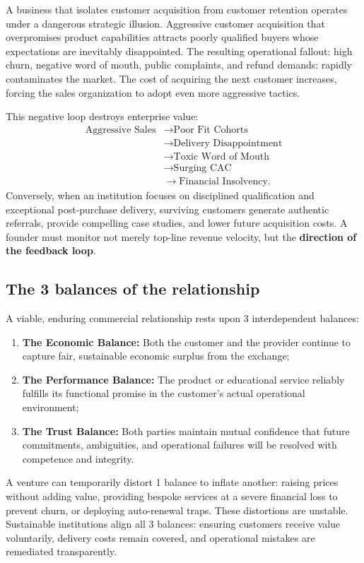 A business that isolates customer acquisition from customer retention operates under a dangerous strategic illusion. Aggressive customer acquisition that overpromises product capabilities attracts poorly qualified buyers whose expectations are inevitably disappointed. The resulting operational fallout: high churn, negative word of mouth, public complaints, and refund demands: rapidly contaminates the market. The cost of acquiring the next customer increases, forcing the sales organization to adopt even more aggressive tactics.

This negative loop destroys enterprise value:
\begin{equation}
\begin{aligned}
\text{Aggressive Sales} &\longrightarrow \text{Poor Fit Cohorts} \\
&\longrightarrow \text{Delivery Disappointment} \\
&\longrightarrow \text{Toxic Word of Mouth} \\
&\longrightarrow \text{Surging CAC} \\
&\longrightarrow \text{Financial Insolvency}.
\end{aligned}
\end{equation}
Conversely, when an institution focuses on disciplined qualification and exceptional post-purchase delivery, surviving customers generate authentic referrals, provide compelling case studies, and lower future acquisition costs. A founder must monitor not merely top-line revenue velocity, but the \textbf{direction of the feedback loop}.

\subsection{The 3 balances of the relationship}

A viable, enduring commercial relationship rests upon 3 interdependent balances:
\begin{enumerate}
\item \textbf{The Economic Balance:} Both the customer and the provider continue to capture fair, sustainable economic surplus from the exchange;
\item \textbf{The Performance Balance:} The product or educational service reliably fulfills its functional promise in the customer's actual operational environment;
\item \textbf{The Trust Balance:} Both parties maintain mutual confidence that future commitments, ambiguities, and operational failures will be resolved with competence and integrity.
\end{enumerate}
A venture can temporarily distort 1 balance to inflate another: raising prices without adding value, providing bespoke services at a severe financial loss to prevent churn, or deploying auto-renewal traps. These distortions are unstable. Sustainable institutions align all 3 balances: ensuring customers receive value voluntarily, delivery costs remain covered, and operational mistakes are remediated transparently.

